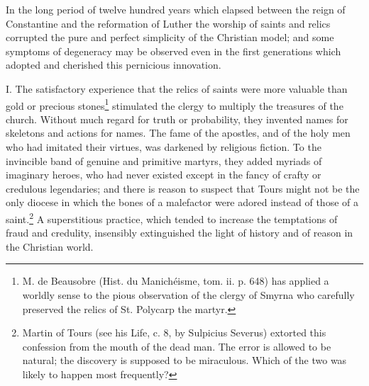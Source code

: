 In the long period of twelve hundred years which elapsed between the reign of Constantine and the reformation of Luther the worship of saints and relics corrupted the pure and perfect simplicity of the Christian model; and some symptoms of degeneracy may be observed even in the first generations which adopted and cherished this pernicious innovation.

I. The satisfactory experience that the relics of saints were more valuable than gold or precious stones\footnote{M. de Beausobre (Hist. du Manichéisme, tom. ii. p. 648) has applied a worldly sense to the pious observation of the clergy of Smyrna who carefully preserved the relics of St. Polycarp the martyr.} stimulated the clergy to multiply the treasures of the church. Without much regard for truth or probability, they invented names for skeletons and actions for names. The fame of the apostles, and of the holy men who had imitated their virtues, was darkened by religious fiction. To the invincible band of genuine and primitive martyrs, they added myriads of imaginary heroes, who had never existed except in the fancy of crafty or credulous legendaries; and there is reason to suspect that Tours might not be the only diocese in which the bones of a malefactor were adored instead of those of a saint.\footnote{Martin of Tours (see his Life, c. 8, by Sulpicius Severus) extorted this confession from the mouth of the dead man. The error is allowed to be natural; the discovery is supposed to be miraculous. Which of the two was likely to happen most frequently?} A superstitious practice, which tended to increase the temptations of fraud and credulity, insensibly extinguished the light of history and of reason in the Christian world.

